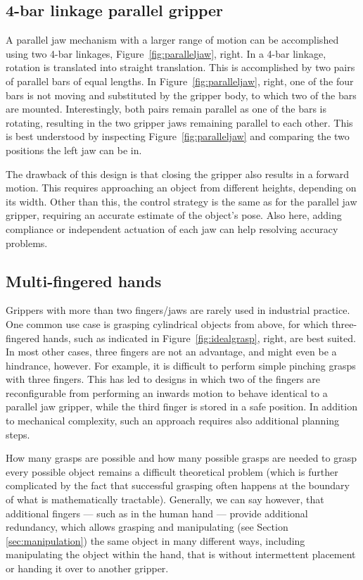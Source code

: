 \subsection{4-bar linkage parallel gripper}
A parallel jaw mechanism with a larger range of motion can be accomplished using two 4-bar linkages, Figure~\ref{fig:paralleljaw}, right. In a 4-bar linkage, rotation is translated into  straight translation. This is accomplished by two pairs of parallel bars of equal lengths. In Figure~\ref{fig:paralleljaw}, right, one of the four bars is not moving and substituted by the gripper body, to which two of the bars are mounted. Interestingly, both pairs remain parallel as one of the bars is rotating, resulting in the two gripper jaws remaining parallel to each other. This is best understood by inspecting Figure~\ref{fig:paralleljaw} and comparing the two positions the left jaw can be in. 


The drawback of this design is that closing the gripper also results in a forward motion. This requires approaching an object from different heights, depending on its width. Other than this, the control strategy is the same as for the parallel jaw gripper, requiring an accurate estimate of the object's pose. Also here, adding compliance or independent actuation of each jaw can help resolving accuracy problems. 

\subsection{Multi-fingered hands}
Grippers with more than two fingers/jaws are rarely used in industrial practice. One common use case is grasping cylindrical objects from above, for which three-fingered hands, such as indicated in Figure~\ref{fig:idealgrasp}, right, are best suited. In most other cases, three fingers are not an advantage, and might even be a hindrance, however. For example, it is difficult to perform simple pinching grasps with three fingers. This has led to designs in which two of the fingers are reconfigurable from performing an inwards motion to behave identical to a parallel jaw gripper, while the third finger is stored in a safe position. In addition to mechanical complexity, such an approach requires also additional planning steps. 

How many grasps are possible and how many possible grasps are needed to grasp every possible object remains a difficult theoretical problem (which is further complicated by the fact that successful grasping often happens at the boundary of what is mathematically tractable). Generally, we can say however, that additional fingers --- such as in the human hand --- provide additional redundancy, which allows grasping and manipulating (see Section \ref{sec:manipulation}) the same object in many different ways, including manipulating the object within the hand, that is without intermettent placement or handing it over to another gripper. 




